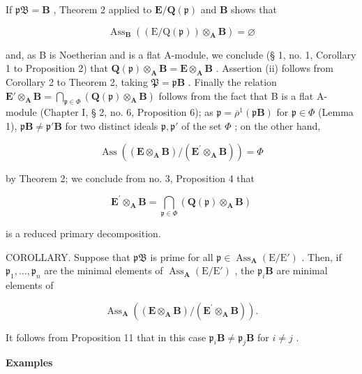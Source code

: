 If \(\mathfrak{pB} = \mathbf{B}\) , Theorem 2 applied to \(\mathbf{E} / \mathbf{Q}(\mathfrak{p})\) and \(\mathbf{B}\) shows that

\[
\operatorname{Ass} _ {\mathbf {B}} ((\mathrm{E} / \mathrm{Q} (\mathfrak {p})) \otimes_ {\mathbf {A}} \mathbf {B}) = \varnothing
\]

and, as B is Noetherian and is a flat A-module, we conclude (§ 1, no. 1, Corollary 1 to Proposition 2) that \(\mathbf{Q}(\mathfrak{p}) \otimes_{\mathbf{A}} \mathbf{B} = \mathbf{E} \otimes_{\mathbf{A}} \mathbf{B}\) . Assertion (ii) follows from Corollary 2 to Theorem 2, taking \(\mathfrak{P} = \mathfrak{p}\mathbf{B}\) . Finally the relation \(\mathbf{E}' \otimes_{\mathbf{A}} \mathbf{B} = \bigcap_{\mathfrak{p} \in \Phi} (\mathbf{Q}(\mathfrak{p}) \otimes_{\mathbf{A}} \mathbf{B})\) follows from the fact that B is a flat A-module (Chapter I, § 2, no. 6, Proposition 6); as \(\mathfrak{p} = \overline{\rho}^{1}(\mathfrak{p}\mathbf{B})\) for \(\mathfrak{p} \in \Phi\) (Lemma 1), \(\mathfrak{p}\mathbf{B} \neq \mathfrak{p}'\mathbf{B}\) for two distinct ideals \(\mathfrak{p}, \mathfrak{p}'\) of the set \(\Phi\) ; on the other hand,

\[
\operatorname{Ass} ((\mathbf {E} \otimes_ {\mathbf {A}} \mathbf {B}) / (\mathbf {E} ^ {\prime} \otimes_ {\mathbf {A}} \mathbf {B})) = \Phi
\]

by Theorem 2; we conclude from no. 3, Proposition 4 that

\[
\mathbf {E} ^ {\prime} \otimes_ {\mathbf {A}} \mathbf {B} = \bigcap_ {\mathfrak {p} \in \Phi} (\mathbf {Q} (\mathfrak {p}) \otimes_ {\mathbf {A}} \mathbf {B})
\]

is a reduced primary decomposition.

COROLLARY. Suppose that \(\mathfrak{pB}\) is prime for all \(\mathfrak{p} \in \operatorname{Ass}_{\mathbf{A}}(\mathrm{E}/\mathrm{E}')\) . Then, if \(\mathfrak{p}_1, \ldots, \mathfrak{p}_n\) are the minimal elements of \(\operatorname{Ass}_{\mathbf{A}}(\mathrm{E}/\mathrm{E}')\) , the \(\mathfrak{p}_i\mathbf{B}\) are minimal elements of

\[
\operatorname{Ass} _ {\mathbf {A}} ((\mathbf {E} \otimes_ {\mathbf {A}} \mathbf {B}) / (\mathbf {E} ^ {\prime} \otimes_ {\mathbf {A}} \mathbf {B})).
\]

It follows from Proposition 11 that in this case \(\mathfrak{p}_i\mathbf{B} \neq \mathfrak{p}_j\mathbf{B}\) for \(i \neq j\) .

\textbf{Examples}\par

